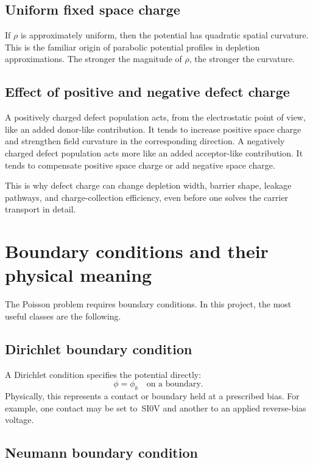 \documentclass[11pt]{article}
\begin{document}
\subsection{Uniform fixed space charge}

If $\rho$ is approximately uniform, then the potential has quadratic spatial curvature. This is the familiar origin of parabolic potential profiles in depletion approximations. The stronger the magnitude of $\rho$, the stronger the curvature.

\subsection{Effect of positive and negative defect charge}

A positively charged defect population acts, from the electrostatic point of view, like an added donor-like contribution. It tends to increase positive space charge and strengthen field curvature in the corresponding direction. A negatively charged defect population acts more like an added acceptor-like contribution. It tends to compensate positive space charge or add negative space charge.

This is why defect charge can change depletion width, barrier shape, leakage pathways, and charge-collection efficiency, even before one solves the carrier transport in detail.

\section{Boundary conditions and their physical meaning}

The Poisson problem requires boundary conditions. In this project, the most useful classes are the following.

\subsection{Dirichlet boundary condition}

A Dirichlet condition specifies the potential directly:
\begin{equation}
\phi = \phi_b \quad \text{on a boundary.}
\end{equation}
Physically, this represents a contact or boundary held at a prescribed bias. For example, one contact may be set to \,SI{0}{V} and another to an applied reverse-bias voltage.

\subsection{Neumann boundary condition}
\end{document}
